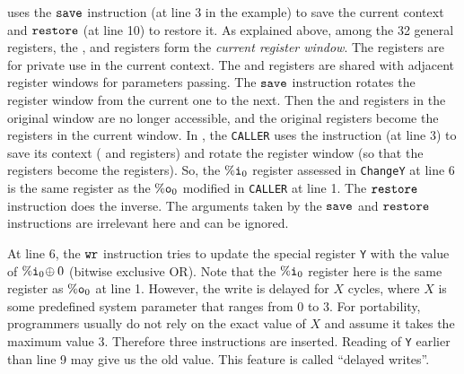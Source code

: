 \sparc{} uses the $\texttt{save}$ instruction (at line 3 in the example)
to save the current context
and $\texttt{restore}$ (at line 10) to restore it.
As explained above, among the 32 general registers,
the \outRN{}, \localRN{} and \inRN{} registers form the
{\em current register window}.
The \localRN{} registers are for private use in the current context.
The \inRN{} and \outRN{} registers are shared with adjacent register windows
for parameters passing.
The $\texttt{save}$ instruction rotates the register window from the
current one to the next. Then the \localRN{} and \inRN{}
registers in the original window are no longer accessible,
and the original \outRN{} registers become the \inRN{} registers
in the current window.
In \Fig{\ref{fig:An Example for SPARC Code}},
the \texttt{CALLER} uses the \csave{} instruction 
(at line 3) to save its context
(\localRN{} and \inRN{} registers) and rotate the
register window (so that the 
\outRN{} registers become the \inRN{} registers).
So, the $\%\texttt{i}_{0}$ register
assessed in \texttt{ChangeY} at line 6 is
the same register as the $\%\texttt{o}_{0}$ modified in
\texttt{CALLER} at line 1.
The $\texttt{restore}$ instruction does the inverse.
The arguments taken by the $\texttt{save}$ and  $\texttt{restore}$ instructions
are irrelevant here and can be ignored.


At line 6, the $\texttt{wr}$ instruction tries to
update the special register {\tt Y}
with the value of $\%\texttt{i}_{0} \! \oplus 0$
(bitwise exclusive OR).
Note that the $\%\texttt{i}_{0}$
register here is the same register as $\%\texttt{o}_{0}$ at line 1.
However, the write is delayed for $X$ cycles,
where $X$ is some predefined system parameter
that ranges from 0 to 3.
For portability, programmers usually do not rely
on the exact value of $X$ and assume it takes
the maximum value 3.
Therefore three \nop{} instructions
are inserted.
Reading of {\tt Y} earlier than line 9
may give us the old value.
This feature is called ``delayed writes''.

